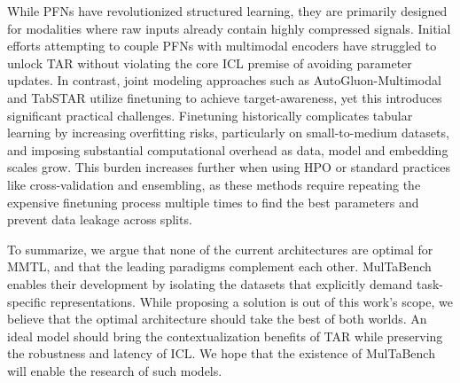 \documentclass{llmxive}
\begin{document}
While PFNs have revolutionized structured learning, they are primarily designed for modalities where raw inputs already contain highly compressed signals. Initial efforts attempting to couple PFNs with multimodal encoders \cite{luo_time_2025, kim_multimodalpfn_2025} have struggled to unlock TAR without violating the core ICL premise of avoiding parameter updates. In contrast, joint modeling approaches such as AutoGluon-Multimodal and TabSTAR utilize finetuning to achieve target-awareness, yet this introduces significant practical challenges. Finetuning historically complicates tabular learning by increasing overfitting risks, particularly on small-to-medium datasets, and imposing substantial computational overhead as data, model and embedding scales grow. This burden increases further when using HPO or standard practices like cross-validation and ensembling, as these methods require repeating the expensive finetuning process multiple times to find the best parameters and prevent data leakage across splits.

To summarize, we argue that none of the current architectures are optimal for MMTL, and that the leading paradigms complement each other. MulTaBench enables their development by isolating the datasets that explicitly demand task-specific representations. While proposing a solution is out of this work's scope, we believe that the optimal architecture should take the best of both worlds. An ideal model should bring the contextualization benefits of TAR while preserving the robustness and latency of ICL. We hope that the existence of MulTaBench will enable the research of such models.
\end{document}
